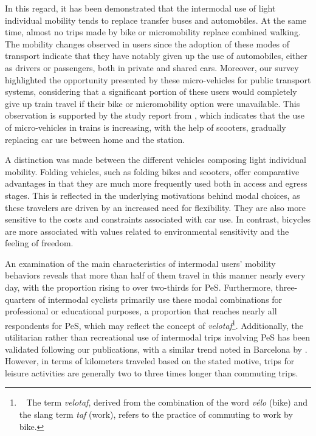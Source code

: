 \begin{refsegment}
In this regard, it has been demonstrated that the intermodal use of light individual mobility tends to replace transfer buses and automobiles. At the same time, almost no trips made by bike or micromobility replace combined walking. The mobility changes observed in users since the adoption of these modes of transport indicate that they have notably given up the use of automobiles, either as drivers or passengers, both in private and shared cars. Moreover, our survey highlighted the opportunity presented by these micro-vehicles for public transport systems, considering that a significant portion of these users would completely give up train travel if their bike or micromobility option were unavailable. This observation is supported by the study report from \textcolor{blue}{\textcite[]{enov_enquete_2021}}, which indicates that the use of micro-vehicles in trains is increasing, with the help of scooters, gradually replacing car use between home and the station.%

A distinction was made between the different vehicles composing light individual mobility. Folding vehicles, such as folding bikes and scooters, offer comparative advantages in that they are much more frequently used both in access and egress stages. This is reflected in the underlying motivations behind modal choices, as these travelers are driven by an increased need for flexibility. They are also more sensitive to the costs and constraints associated with car use. In contrast, bicycles are more associated with values related to environmental sensitivity and the feeling of freedom.%

An examination of the main characteristics of intermodal users' mobility behaviors reveals that more than half of them travel in this manner nearly every day, with the proportion rising to over two-thirds for \acrshort{PeS}. Furthermore, three-quarters of intermodal cyclists primarily use these modal combinations for professional or educational purposes, a proportion that reaches nearly all respondents for \acrshort{PeS}, which may reflect the concept of \textsl{velotaf}\footnote{~
   The term \textsl{velotaf}, derived from the combination of the word \textsl{vélo} (bike) and the slang term \textsl{taf} (work), refers to the practice of commuting to work by bike.
}. Additionally, the utilitarian rather than recreational use of intermodal trips involving \acrshort{PeS} has been validated following our publications, with a similar trend noted in Barcelona by \textcolor{blue}{\textcite[9]{roig-costa_disrupted_2024}}. However, in terms of kilometers traveled based on the stated motive, trips for leisure activities are generally two to three times longer than commuting trips.%


\end{refsegment}
